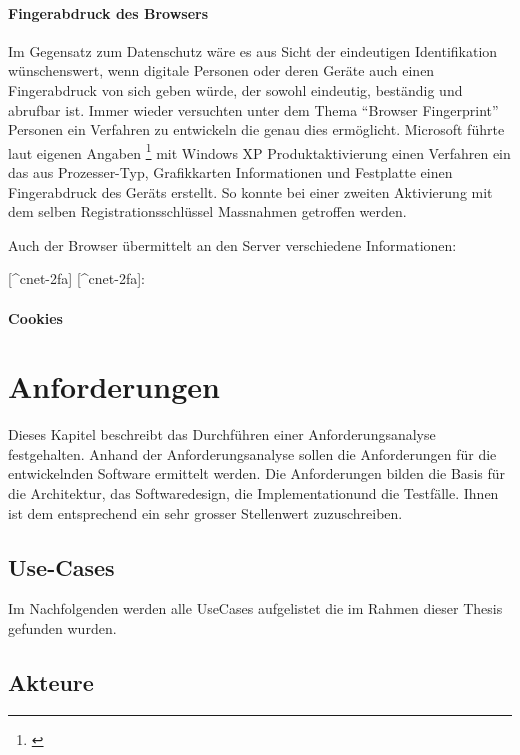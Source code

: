 \subsubsection{Fingerabdruck des
Browsers}\label{fingerabdruck-des-browsers}

Im Gegensatz zum Datenschutz wäre es aus Sicht der eindeutigen
Identifikation wünschenswert, wenn digitale Personen oder deren Geräte
auch einen Fingerabdruck von sich geben würde, der sowohl eindeutig,
beständig und abrufbar ist. Immer wieder versuchten unter dem Thema
``Browser Fingerprint'' Personen ein Verfahren zu entwickeln die genau
dies ermöglicht. Microsoft führte laut eigenen Angaben \footnote{\autocite{xpactivation}}
mit Windows XP Produktaktivierung einen Verfahren ein das aus
Prozesser-Typ, Grafikkarten Informationen und Festplatte einen
Fingerabdruck des Geräts erstellt. So konnte bei einer zweiten
Aktivierung mit dem selben Registrationsschlüssel Massnahmen getroffen
werden.

Auch der Browser übermittelt an den Server verschiedene Informationen:

{[}\^{}cnet-2fa{]} {[}\^{}cnet-2fa{]}: \autocite{cnet-2fa}

\subsubsection{Cookies}\label{cookies}

\chapter{Anforderungen}\label{anforderungen}

Dieses Kapitel beschreibt das Durchführen einer Anforderungsanalyse
festgehalten. Anhand der Anforderungsanalyse sollen die Anforderungen
für die entwickelnden Software ermittelt werden. Die Anforderungen
bilden die Basis für die Architektur, das Softwaredesign, die
Implementationund die Testfälle. Ihnen ist dem entsprechend ein sehr
grosser Stellenwert zuzuschreiben.

\section{Use-Cases}\label{use-cases}

Im Nachfolgenden werden alle UseCases aufgelistet die im Rahmen dieser
Thesis gefunden wurden.

\section{Akteure}\label{akteure}

